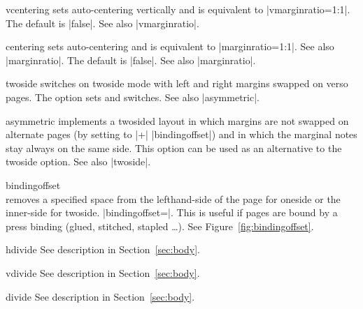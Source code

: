 \begin{Options}
\item[vcentering] sets auto-centering vertically and is
  equivalent to |vmarginratio=1:1|. The default is |false|.
  See also |vmarginratio|.
\item[centering] sets auto-centering and is equivalent to
  |marginratio=1:1|. See also |marginratio|. The default is |false|.
  See also |marginratio|.
\item[twoside] switches on twoside mode with left and right margins swapped
  on verso pages. The option sets  and  
  switches. See also |asymmetric|.
\item[asymmetric] implements a twosided layout in which margins are
  not swapped on alternate pages (by setting  to 
   |+| |bindingoffset|) and in which the marginal notes
  stay always on the same side. This option can be used as an alternative
  to the twoside option. See also |twoside|.
\item[bindingoffset]~\\ removes a specified space 
  from the lefthand-side of the page for oneside or the inner-side for
  twoside. |bindingoffset=|. This is useful if pages 
  are bound by a press binding (glued, stitched, stapled \ldots).
  See Figure~\ref{fig:bindingoffset}.
\item[hdivide] See description in Section~\ref{sec:body}.
\item[vdivide] See description in Section~\ref{sec:body}.
\item[divide] See description in Section~\ref{sec:body}.
\end{Options}
